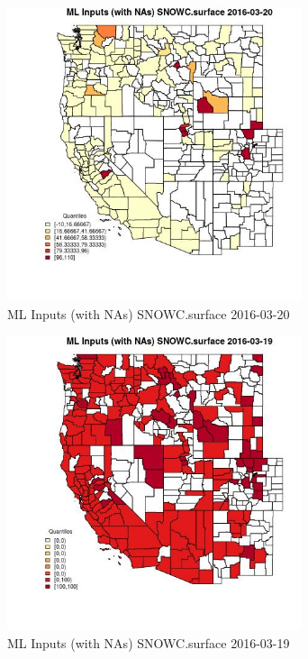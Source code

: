 \begin{figure} 
\centering  
\includegraphics[width=0.77\textwidth]{Code_Outputs/Report_ML_input_PM25_Step4_part_e_de_duplicated_aveswNAs_CountySNOWCsurfaceMean2016-03-20_2016-03-20.jpg} 
\caption{\label{fig:Report_ML_input_PM25_Step4_part_e_de_duplicated_aveswNAsCountySNOWCsurfaceMean2016-03-20_2016-03-20}ML Inputs (with NAs) SNOWC.surface 2016-03-20} 
\end{figure} 
 

\begin{figure} 
\centering  
\includegraphics[width=0.77\textwidth]{Code_Outputs/Report_ML_input_PM25_Step4_part_e_de_duplicated_aveswNAs_CountySNOWCsurfaceMean2016-03-19_2016-03-19.jpg} 
\caption{\label{fig:Report_ML_input_PM25_Step4_part_e_de_duplicated_aveswNAsCountySNOWCsurfaceMean2016-03-19_2016-03-19}ML Inputs (with NAs) SNOWC.surface 2016-03-19} 
\end{figure} 
 

